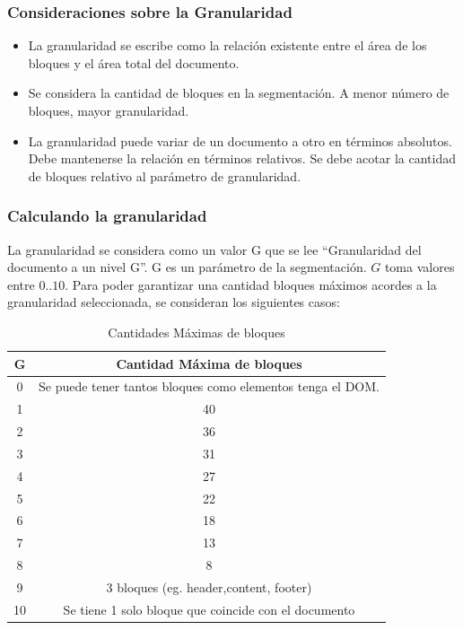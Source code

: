 \documentclass[10pt]{revecom}
\begin{document}
\subsubsection{Consideraciones sobre la Granularidad}
\begin{itemize}
\item La granularidad se escribe como la relación existente entre el área de los bloques y el área total del documento. 
%
\item Se considera la cantidad de bloques en la segmentación. A menor número de bloques, mayor granularidad.
%
\item La granularidad puede variar de un documento a otro en términos absolutos. Debe mantenerse la relación en términos relativos. 
Se debe acotar la cantidad de bloques relativo al parámetro de granularidad. 
\end{itemize}

\subsubsection{Calculando la granularidad}

La granularidad se considera como un valor G que se lee ``Granularidad del documento a un nivel G''. G es un parámetro de la segmentación.
$G$ toma valores entre $0..10$. 
Para poder garantizar una cantidad bloques máximos acordes a la granularidad seleccionada, se consideran los siguientes casos:
\begin{table}[!h]
\caption{Cantidades Máximas de bloques}
\label{tab:calc_granularidad}
\centering
\begin{tabular}{|c|c|}
\hline
\textbf{G} & \textbf{Cantidad Máxima de bloques} \\ \hline
0 & Se puede tener tantos bloques como elementos tenga el DOM. \\ \hline
1 & 40 \\ \hline
2 & 36 \\ \hline
3 &  31 \\ \hline
4 &  27 \\ \hline
5 &  22 \\ \hline
6 &  18 \\ \hline
7 & 13 \\ \hline
8 &  8 \\ \hline
9 & 3 bloques (eg. header,content, footer) \\ \hline
10 & Se tiene 1 solo bloque que coincide con el documento  \\
\hline
\end{tabular}
\end{table}
\end{document}
